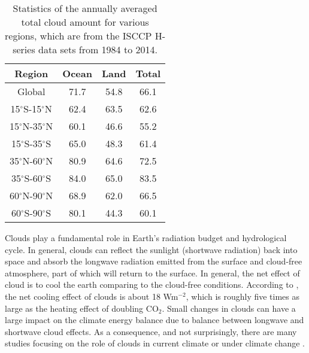 \begin{table}[htp]
\centering
\caption{Statistics of the annually averaged total cloud amount for various regions, which are from the ISCCP H-series data sets \citep{Young2018} from 1984 to 2014.}
\begin{tabular}{cccc}
	\toprule
	Region & Ocean & Land &  Total\\
	\midrule
	Global & 71.7 & 54.8 & 66.1 \\
	15$^\circ$S-15$^\circ$N&  62.4&  63.5& 62.6 \\
	15$^\circ$N-35$^\circ$N&  60.1&  46.6& 55.2\\
	15$^\circ$S-35$^\circ$S&  65.0&  48.3& 61.4\\
	35$^\circ$N-60$^\circ$N&  80.9&  64.6& 72.5 \\
	35$^\circ$S-60$^\circ$S&  84.0&  65.0& 83.5 \\
	60$^\circ$N-90$^\circ$N&  68.9&  62.0& 66.5\\
	60$^\circ$S-90$^\circ$S&  80.1&  44.3& 60.1 \\
	\bottomrule
\end{tabular}
\label{tab:statistics_cld_amt}
\end{table}

Clouds play a fundamental role in Earth's radiation budget and hydrological cycle. In general, clouds can reflect the sunlight (shortwave radiation) back into space and absorb the longwave radiation emitted from the surface and cloud-free atmosphere, part of which will return to the surface. In general, the net effect of cloud is to cool the earth comparing to the cloud-free conditions. According to \cite{Zelinka2017}, the net cooling effect of clouds is about 18 Wm$^{-2}$, which is roughly five times as large as the heating effect of doubling CO$_2$. Small changes in clouds can have a large impact on the climate energy balance due to balance between longwave and shortwave cloud effects. As a consequence, and not surprisingly, there are many studies focusing on the role of clouds in current climate or under climate change \citep[e.g.,][]{Cess1990intercomparison,Zelinka2017}.


